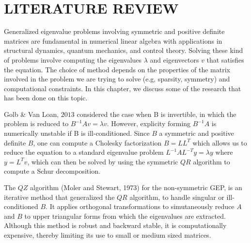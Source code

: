 \chapter{LITERATURE REVIEW}

Generalized eigenvalue problems involving symmetric and positive definite matrices are fundamental in numerical linear algebra with applications in structural  dynamics, quantum mechanics, and control theory. Solving these kind of problems involve computing the eigenvalues $\lambda$ and eigenvectors $v$ that satisfies the equation. The choice of method depends on the properties of the matrix involved in the problem we are trying to solve (e.g, sparsity, symmetry) and computational constraints. In this chapter, we discuss some of the research that has been done on this topic.\par
Golb \& Van Loan, $2013$ considered the case when B is invertible, in which the problem is reduced to $B^{-1}Av = \lambda v$. However, explicity forming $B^{-1}A$ is numerically unstable if B is ill-conditioned. Since $B$ a symmetric and positive definite $B$, one can compute a Cholesky factorization $B = LL^{T}$ which allows us to  reduce the equation to a standard eigenvalue problem $L^{-1}AL^{-T}y = \lambda y$ where $y= L^T v$, which can then be solved by using the symmetric $QR$ algorithm to compute a Schur decomposition.\par
The $QZ$ algorithm (Moler and Stewart, 1973) for the non-symmetric GEP, is an iterative method that generalized the $QR$ algorithm, to handle singular or ill-conditioned $B$. It applies orthogonal transformations to simutaneously reduce $A$ and $B$ to upper triangular forms from which the eigenvalues are extracted. Although this method is robust and backward stable, it is computationally expensive, thereby limiting its use to small or medium sized matrices.\par


